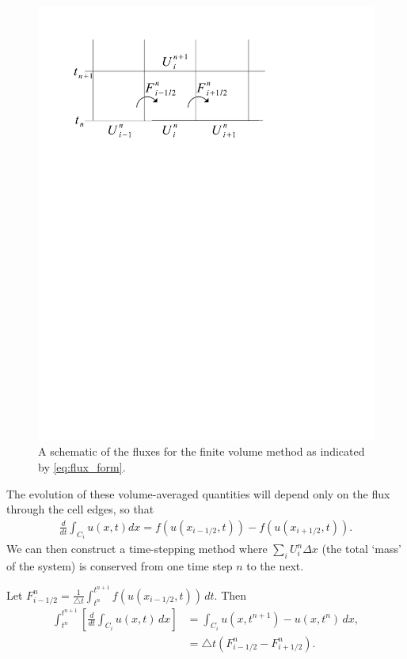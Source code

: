 \begin{figure}[ht]
\centering
\includegraphics[trim= 20mm 195mm 0mm 30mm, clip]{flux_form.pdf}
\caption{A schematic of the fluxes for the finite volume method as indicated by \eqref{eq:flux_form}.}
\end{figure}

The evolution of these volume-averaged quantities will depend only on the flux through the cell edges, so that
\begin{align}\label{eq:1D_semi_continuous}
\frac{d}{dt}\int_{C_i} u(x,t) dx = f(u(x_{i-1/2},t))-f(u(x_{i+1/2},t)).
\end{align}
We can then construct a time-stepping method where $\sum_i U_i^n\Delta x$ (the total `mass' of the system) is conserved from one time step $n$ to the next.  

Let $F^n_{i-1/2} = \frac{1}{\triangle t}\int_{t^n}^{t^{n+1}} f(u(x_{i-1/2},t)) \, dt.$ Then 
\begin{align*}
\int_{t^n}^{t^{n+1}} \left[ \frac{d}{dt}\int_{C_i} u(x,t)\, dx \right] 
&{}= \int_{C_i} u(x,t^{n+1}) - u(x,t^{n})\, dx ,\\
&{ }= \triangle t \left(F^n_{i-1/2} - F^n_{i+1/2}\right).
\end{align*}

